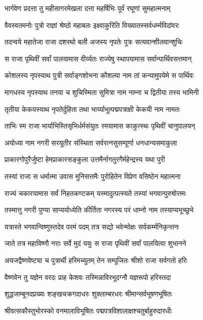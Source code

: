 \twolineshloka
{भार्गवेण प्रदत्ता तु महीसागरमेखला}
{दत्ता महर्षिभिः पूर्वं रघूणां सुमहात्मनाम्}%

\twolineshloka
{वैवस्वतमनोः पुत्रो राज्ञां श्रेष्ठो महाबलः}
{इक्ष्वाकुरिति विख्यातस्सर्वधर्म्मविदांवरः}%

\twolineshloka
{तदन्वये महातेजा राजा दशरथो बली}
{अजस्य नृपतेः पुत्रः सत्यवान्शीलवान्शुचिः}%

\twolineshloka
{स राजा पृथिवीं सर्वां पालयामास वीर्य्यतः}
{राज्येषु स्थापयामास सर्वान्पार्थिवसत्तमान्}%

\twolineshloka
{कोशलस्य नृपस्याथ पुत्री सर्वाङ्गशोभना}
{कौशल्या नाम तां कन्यामुपयेमे स पार्थिवः}%

\twolineshloka
{मागधस्य नृपस्याथ तनया च शुचिस्मिता}
{सुमित्रा नाम नाम्ना च द्वितीया तस्य भामिनी}%

\twolineshloka
{तृतीया केकयस्याथ नृपतेर्दुहिता तथा}
{भार्य्याभूत्पद्मपत्राक्षी केकयी नाम नामतः}%

\twolineshloka
{ताभिः स्म राजा भार्याभिस्तिसृभिर्धर्मसंयुतः}
{रमयामास काकुत्स्थः पृथिवीं चानुपालयन्}%

\twolineshloka
{अयोध्या नाम नगरी सरयूतीर संस्थिता}
{सर्वरत्नसुसम्पूर्णा धनधान्यसमाकुला}%

\twolineshloka
{प्राकारगोपुरैर्जुष्टा हेमप्राकारसङ्कुला}
{उत्तमैर्नागतुरगैर्महेन्द्रस्य यथा पुरी}%

\twolineshloka
{तस्यां राजा स धर्मात्मा उवास मुनिसत्तमैः}
{पुरोहितेन विप्रेण वसिष्ठेन महात्मना}%

\twolineshloka
{राज्यं चकारयामास सर्वं निहतकण्टकम्}
{यस्मादुत्पत्स्यते तस्यां भगवान्पुरुषोत्तमः}%

\twolineshloka
{तस्मात्तु नगरी पुण्या साप्ययोध्येति कीर्तिता}
{नगरस्य परं धाम्नो नाम तस्याप्यभूच्छुभे}%

\twolineshloka
{यत्रास्ते भगवान्विष्णुस्तदेव परमं पदम्}
{तत्र सद्यो भवेन्मोक्षः सर्वकर्म्मनिकृन्तनः}%

\twolineshloka
{जाते तत्र महाविष्णौ नराः सर्वे मुदं ययुः}
{स राजा पृथिवीं सर्वां पालयित्वा शुभानने}%

\twolineshloka
{अयजद्वैष्णवेष्ट्या च पुत्रार्थी हरिमच्युतम्}
{तेन सम्पूजितः श्रीशो राजा सर्वगतो हरिः}%

\twolineshloka
{वैष्णवेन तु यज्ञेन वरदः प्राह केशवः}
{तस्मिन्नाविरभूदग्नौ यज्ञरूपो हरिस्तदा}%

\twolineshloka
{शुद्धजाम्बूनदप्रख्यः शङ्खचक्रगदाधरः}
{शुक्लाम्बरधरः श्रीमान्सर्वभूषणभूषितः}%

\twolineshloka
{श्रीवत्सकौस्तुभोरस्को वनमालाविभूषितः}
{पद्मपत्रविशालाक्षश्चतुर्बाहुरुदारधीः}%

